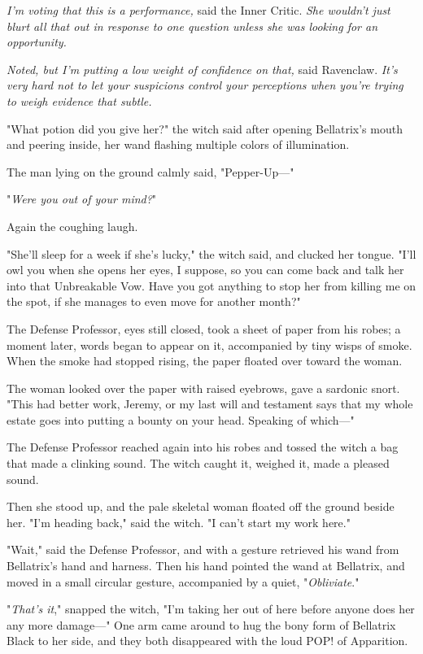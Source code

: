 \emph{I'm voting that this is a performance,} said the Inner Critic. \emph{She 
wouldn't just blurt all that out in response to one question unless she was 
looking for an opportunity.}

\emph{Noted, but I'm putting a low weight of confidence on that,} said 
Ravenclaw. \emph{It's very hard not to let your suspicions control your 
perceptions when you're trying to weigh evidence that subtle.}

"What potion did you give her?" the witch said after opening Bellatrix's mouth 
and peering inside, her wand flashing multiple colors of illumination.

The man lying on the ground calmly said, "Pepper-Up---"

"\emph{Were you out of your mind?}"

Again the coughing laugh.

"She'll sleep for a week if she's lucky," the witch said, and clucked her 
tongue. "I'll owl you when she opens her eyes, I suppose, so you can come back 
and talk her into that Unbreakable Vow. Have you got anything to stop her from 
killing me on the spot, if she manages to even move for another month?"

The Defense Professor, eyes still closed, took a sheet of paper from his robes; 
a moment later, words began to appear on it, accompanied by tiny wisps of 
smoke. When the smoke had stopped rising, the paper floated over toward the 
woman.

The woman looked over the paper with raised eyebrows, gave a sardonic snort. 
"This had better work, Jeremy, or my last will and testament says that my whole 
estate goes into putting a bounty on your head. Speaking of which---"

The Defense Professor reached again into his robes and tossed the witch a bag 
that made a clinking sound. The witch caught it, weighed it, made a pleased 
sound.

Then she stood up, and the pale skeletal woman floated off the ground beside 
her. "I'm heading back," said the witch. "I can't start my work here."

"Wait," said the Defense Professor, and with a gesture retrieved his wand from 
Bellatrix's hand and harness. Then his hand pointed the wand at Bellatrix, and 
moved in a small circular gesture, accompanied by a quiet, "\emph{Obliviate}."

"\emph{That's it}," snapped the witch, "I'm taking her out of here before 
anyone does her any more damage---" One arm came around to hug the bony form of 
Bellatrix Black to her side, and they both disappeared with the loud POP! of 
Apparition.

